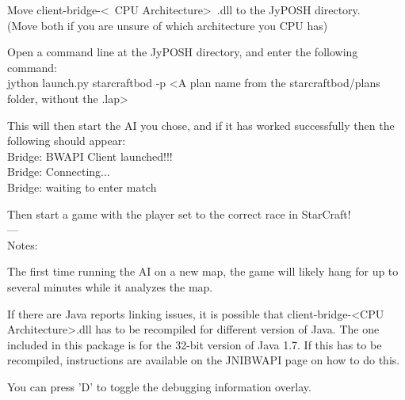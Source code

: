 \documentclass[11pt,openright,a4paper]{report}
\begin{document}
	Move client-bridge-\textless~CPU Architecture\textgreater~.dll to the JyPOSH directory.\\
	(Move both if you are unsure of which architecture you CPU has)

	Open a command line at the JyPOSH directory, and enter the following command:\\
	jython launch.py starcraftbod -p \textless A plan name from the starcraftbod/plans folder, without the .lap\textgreater

	This will then start the AI you chose, and if it has worked successfully then the following should appear:\\

	Bridge: BWAPI Client launched!!!\\
	Bridge: Connecting...\\
	Bridge: waiting to enter match

	Then start a game with the player set to the correct race in StarCraft!\\
---\\
Notes:

The first time running the AI on a new map, the game will likely hang for up to several minutes while it analyzes the map.

If there are Java reports linking issues, it is possible that client-bridge-\textless CPU Architecture\textgreater .dll has to be recompiled for different version of Java. The one included in this package is for the 32-bit version of Java 1.7. If this has to be recompiled, instructions are available on the JNIBWAPI page on how to do this.

You can press 'D' to toggle the debugging information overlay.
\end{document}
